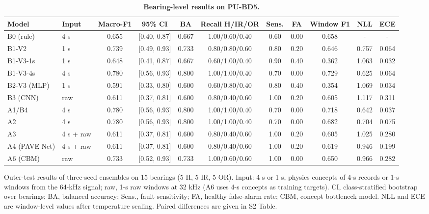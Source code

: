 \documentclass[10pt,letterpaper]{article}
\begin{document}
\begin{table}[!ht]
\centering
\caption{\textbf{Bearing-level results on PU-BD5.}}
{\footnotesize
\setlength{\tabcolsep}{4pt}
\renewcommand{\arraystretch}{1.25}
\begin{tabular}{llccccccccc}
\hline
Model & Input & Macro-F1 & 95\% CI & BA & Recall H/IR/OR & Sens. & FA & Window F1 & NLL & ECE \\
\hline
B0 (rule) & 4 s & 0.655 & [0.40, 0.87] & 0.667 & 1.00/0.60/0.40 & 0.60 & 0.00 & 0.658 & - & - \\
B1-V2 & 1 s & 0.739 & [0.49, 0.93] & 0.733 & 0.80/0.80/0.60 & 0.80 & 0.20 & 0.646 & 0.757 & 0.064 \\
B1-V3-1s & 1 s & 0.648 & [0.41, 0.87] & 0.667 & 0.60/1.00/0.40 & 0.90 & 0.40 & 0.362 & 1.063 & 0.032 \\
B1-V3-4s & 4 s & 0.780 & [0.56, 0.93] & 0.800 & 1.00/1.00/0.40 & 0.70 & 0.00 & 0.729 & 0.625 & 0.064 \\
B2-V3 (MLP) & 1 s & 0.591 & [0.33, 0.80] & 0.600 & 0.60/0.80/0.40 & 0.80 & 0.40 & 0.354 & 1.069 & 0.034 \\
B3 (CNN) & raw & 0.611 & [0.37, 0.81] & 0.600 & 0.80/0.40/0.60 & 1.00 & 0.20 & 0.605 & 1.117 & 0.311 \\
A1/B4 & 4 s & 0.780 & [0.56, 0.93] & 0.800 & 1.00/1.00/0.40 & 0.70 & 0.00 & 0.718 & 0.642 & 0.037 \\
A2 & 4 s & 0.780 & [0.56, 0.93] & 0.800 & 1.00/1.00/0.40 & 0.70 & 0.00 & 0.682 & 0.704 & 0.075 \\
A3 & 4 s + raw & 0.611 & [0.37, 0.81] & 0.600 & 0.80/0.40/0.60 & 1.00 & 0.20 & 0.605 & 1.025 & 0.280 \\
A4 (PAVE-Net) & 4 s + raw & 0.611 & [0.37, 0.81] & 0.600 & 0.80/0.40/0.60 & 1.00 & 0.20 & 0.619 & 0.946 & 0.199 \\
A6 (CBM) & raw & 0.733 & [0.52, 0.93] & 0.733 & 1.00/0.60/0.60 & 1.00 & 0.00 & 0.650 & 0.966 & 0.282 \\
\hline
\end{tabular}}
\begin{flushleft} Outer-test results of three-seed ensembles on 15 bearings (5 H, 5 IR, 5 OR). Input: 4 s or 1 s, physics concepts of 4-s records or 1-s windows from the 64-kHz signal; raw, 1-s raw windows at 32 kHz (A6 uses 4-s concepts as training targets). CI, class-stratified bootstrap over bearings; BA, balanced accuracy; Sens., fault sensitivity; FA, healthy false-alarm rate; CBM, concept bottleneck model. NLL and ECE are window-level values after temperature scaling. Paired differences are given in S2 Table. \end{flushleft}
\label{tab:baselines}
\end{table}
\end{document}
